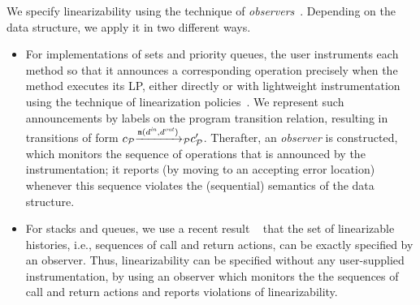 We specify linearizability using the technique of
{\em observers}~\cite{AHHR:integrated,BEEH:icalp15,HSV:concur13,Quy:sas16}.
Depending on the data structure, we apply it in two different ways.
\begin{itemize}
    \item For implementations of sets and priority queues,
the user instruments each method so that it announces
a corresponding operation precisely when the method executes its LP, either
directly or with lightweight instrumentation using
the technique of linearization policies~\cite{Quy:sas16}.
We represent such announcements by labels on the program
transition relation, resulting in transitions of form
$c_{{\mathcal P}}{\xrightarrow{{\tt m}(d^{\it in},d^{\it out})}{}}_{\!\!{\mathcal P}}c_{{\mathcal P}}'$.
Therafter, an {\em observer} is constructed, which
monitors the sequence of operations that is announced by the
instrumentation; it reports (by moving to an accepting error location)
whenever this sequence violates the (sequential) semantics of the
data structure.
\item
  For stacks and queues, we use a recent result
~\cite{BEEH:icalp15,HSV:concur13} that the set of linearizable histories,
i.e., sequences of call and return actions,
can be exactly specified by an observer.
Thus, linearizability can be specified without
any user-supplied instrumentation, by using an observer which monitors
the the sequences of call and return actions and reports violations of
linearizability.
\end{itemize}





